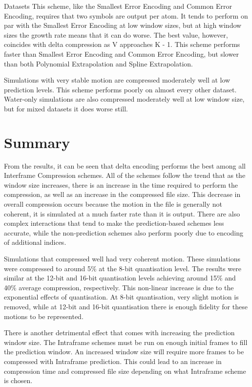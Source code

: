 \documentclass[a4paper,11pt]{report}
\begin{document}
\begin{section}{Datasets}
This scheme, like the Smallest Error Encoding and Common Error Encoding, requires that two symbols are output per atom. It tends to perform on par with the Smallest Error Encoding at low window sizes, but at high window sizes the growth rate means that it can do worse. The best value, however, coincides with delta compression as V approaches K - 1. This scheme performs faster than Smallest Error Encoding and Common Error Encoding, but slower than both Polynomial Extrapolation and Spline Extrapolation.

Simulations with very stable motion are compressed moderately well at low prediction levels. This scheme performs poorly on almost every other dataset. Water-only simulations are also compressed moderately well at low window size, but for mixed datasets it does worse still.

\end{section}

\section{Summary}

From the results, it can be seen that delta encoding performs the best among all Interframe Compression schemes. All of the schemes follow the trend that as the window size increases, there is an increase in the time required to perform the compression, as well as an increase in the compressed file size. This decrease in overall compression occurs because the motion in the file is generally not coherent, it is simulated at a much faster rate than it is output. There are also complex interactions that tend to make the prediction-based schemes less accurate, while the non-prediction schemes also perform poorly due to encoding of additional indices.

Simulations that compressed well had very coherent motion. These simulations were compressed to around 5\% at the 8-bit quantisation level. The results were similar at the 12-bit and 16-bit quantisation levels achieving around 15\% and 40\% average compression, respectively. This non-linear increase is due to the exponential effects of quantisation. At 8-bit quantisation, very slight motion is removed, while at 12-bit and 16-bit quantisation there is enough fidelity for these motions to be represented.

There is another detrimental effect that comes with increasing the prediction window size. The Intraframe schemes must be run on enough initial frames to fill the prediction window. An increased window size will require more frames to be compressed with Intraframe prediction. This could lead to an increase in compression time and compressed file size depending on what Intraframe scheme is chosen. 
\end{document}
